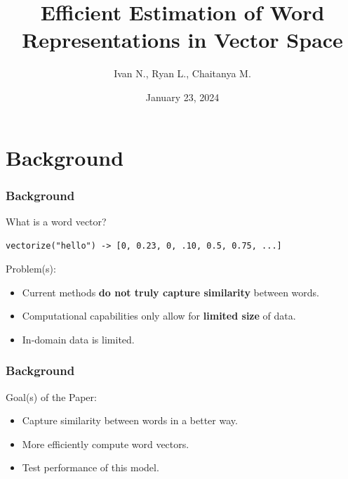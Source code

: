 \documentclass[aspectratio=169]{beamer}
\title{Efficient Estimation of Word Representations in Vector Space}
\author{Ivan N., Ryan L., Chaitanya M.}
\institute{UC Riverside}
\date{January 23, 2024}
\begin{document}
\begin{frame}
\titlepage
\end{frame}

\section{Background}
\begin{frame}[fragile]
\frametitle{Background}

What is a word vector?

\begin{verbatim}
vectorize("hello") -> [0, 0.23, 0, .10, 0.5, 0.75, ...]
\end{verbatim}


\vskip 0.2in

Problem(s):
\begin{itemize}
    \item Current methods \textbf{do not truly capture similarity} between words.
    \item Computational capabilities only allow for \textbf{limited size} of data.
    \item In-domain data is limited.
\end{itemize}

\end{frame}

\begin{frame}
\frametitle{Background}
Goal(s) of the Paper:
\begin{itemize}
    \item Capture similarity between words in a better way.
    \item More efficiently compute word vectors.
    \item Test performance of this model.
\end{itemize}

\end{frame}
\end{document}
